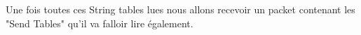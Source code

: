 \documentclass{article}
\begin{document}
\newpage

Une fois toutes ces String tables lues nous allons recevoir un packet contenant les "Send Tables" qu'il va falloir lire également.
\end{document}

